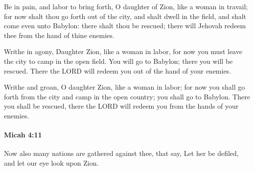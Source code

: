 			\begin{versebox}
					\item[BHS] 
					\item[LXX] 
					\item[ASV] Be in pain, and labor to bring forth, O daughter of Zion, like a woman in travail; for now shalt thou go forth out of the city, and shalt dwell in the field, and shalt come even unto Babylon: there shalt thou be rescued; there will Jehovah redeem thee from the hand of thine enemies.
					\item[NIV] Writhe in agony, Daughter Zion, like a woman in labor, for now you must leave the city to camp in the open field. You will go to Babylon; there you will be rescued. There the LORD will redeem you out of the hand of your enemies.
					\item[NRSV] Writhe and groan, O daughter Zion, like a woman in labor; for now you shall go forth from the city and camp in the open country; you shall go to Babylon. There you shall be rescued, there the LORD will redeem you from the hands of your enemies.
			\end{versebox}

		\paragraph{Micah 4:11} %
			\label{MICAH-4-11}

			Now also many nations are gathered against thee, that say, Let her be defiled, and let our eye look upon Zion.

